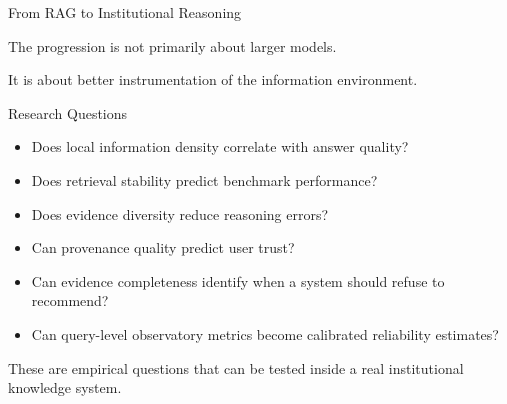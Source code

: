 \documentclass[aspectratio=169]{beamer}
\begin{document}
\begin{frame}{From RAG to Institutional Reasoning}

\begin{center}
\end{center}

\vspace{0.7cm}

The progression is not primarily about larger models.

\vspace{0.3cm}

It is about better instrumentation of the information environment.

\end{frame}

\begin{frame}{Research Questions}

\small

\begin{itemize}
\item Does local information density correlate with answer quality?
\item Does retrieval stability predict benchmark performance?
\item Does evidence diversity reduce reasoning errors?
\item Can provenance quality predict user trust?
\item Can evidence completeness identify when a system should refuse to recommend?
\item Can query-level observatory metrics become calibrated reliability estimates?
\end{itemize}

\vspace{0.4cm}

These are empirical questions that can be tested inside a real institutional knowledge system.

\end{frame}
\end{document}
